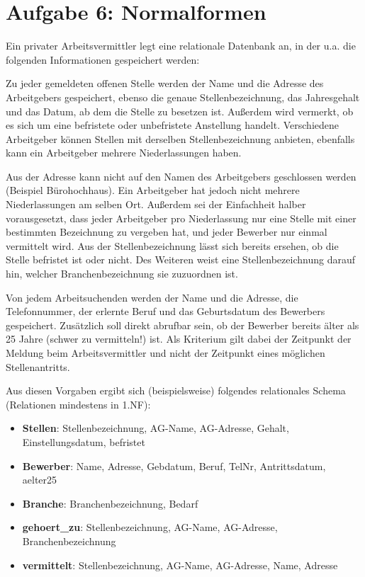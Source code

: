 \documentclass{lehramt-informatik}
\begin{document}
%

\section{Aufgabe 6: Normalformen}

Ein privater Arbeitsvermittler legt eine relationale Datenbank an, in
der u.a. die folgenden Informationen gespeichert werden:

Zu jeder gemeldeten offenen Stelle werden der Name und die Adresse des
Arbeitgebers gespeichert, ebenso die genaue Stellenbezeichnung, das
Jahresgehalt und das Datum, ab dem die Stelle zu besetzen ist. Außerdem
wird vermerkt, ob es sich um eine befristete oder unbefristete
Anstellung handelt. Verschiedene Arbeitgeber können Stellen mit
derselben Stellenbezeichnung anbieten, ebenfalls kann ein Arbeitgeber
mehrere Niederlassungen haben.

Aus der Adresse kann nicht auf den Namen des Arbeitgebers geschlossen
werden (Beispiel Bürohochhaus). Ein Arbeitgeber hat jedoch nicht mehrere
Niederlassungen am selben Ort. Außerdem sei der Einfachheit halber
vorausgesetzt, dass jeder Arbeitgeber pro Niederlassung nur eine Stelle
mit einer bestimmten Bezeichnung zu vergeben hat, und jeder Bewerber nur
einmal vermittelt wird. Aus der Stellenbezeichnung lässt sich bereits
ersehen, ob die Stelle befristet ist oder nicht. Des Weiteren weist eine
Stellenbezeichnung darauf hin, welcher Branchenbezeichnung sie
zuzuordnen ist.

Von jedem Arbeitsuchenden werden der Name und die Adresse, die
Telefonnummer, der erlernte Beruf und das Geburtsdatum des Bewerbers
gespeichert. Zusätzlich soll direkt abrufbar sein, ob der Bewerber
bereits älter als 25 Jahre (schwer zu vermitteln!) ist. Als Kriterium
gilt dabei der Zeitpunkt der Meldung beim Arbeitsvermittler und nicht
der Zeitpunkt eines möglichen Stellenantritts.

Aus diesen Vorgaben ergibt sich (beispielsweise) folgendes relationales
Schema (Relationen mindestens in 1.NF):

\begin{itemize}
\item \textbf{Stellen}: Stellenbezeichnung, AG-Name, AG-Adresse, Gehalt,
Einstellungsdatum, befristet

\item \textbf{Bewerber}: Name, Adresse, Gebdatum, Beruf, TelNr,
Antrittsdatum, aelter25

\item \textbf{Branche}: Branchenbezeichnung, Bedarf

\item \textbf{gehoert\_zu}: Stellenbezeichnung, AG-Name, AG-Adresse,
Branchenbezeichnung

\item \textbf{vermittelt}: Stellenbezeichnung, AG-Name, AG-Adresse,
Name, Adresse
\end{itemize}
\end{document}
